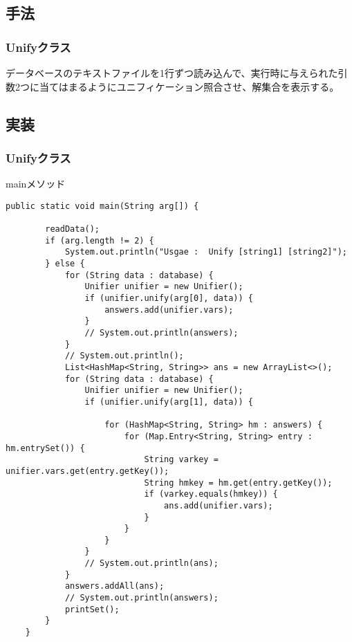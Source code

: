 \documentclass[a4j]{jarticle}
\begin{document}
\subsection{手法}
\subsubsection{Unifyクラス}
データベースのテキストファイルを1行ずつ読み込んで、実行時に与えられた引数2つに当てはまるようにユニフィケーション照合させ、解集合を表示する。

\subsection{実装}
\subsubsection{Unifyクラス}
mainメソッド
\begin{lstlisting}
public static void main(String arg[]) {

        readData();
        if (arg.length != 2) {
            System.out.println("Usgae :  Unify [string1] [string2]");
        } else {
            for (String data : database) {
                Unifier unifier = new Unifier();
                if (unifier.unify(arg[0], data)) {
                    answers.add(unifier.vars);
                }
                // System.out.println(answers);
            }
            // System.out.println();
            List<HashMap<String, String>> ans = new ArrayList<>();
            for (String data : database) {
                Unifier unifier = new Unifier();
                if (unifier.unify(arg[1], data)) {

                    for (HashMap<String, String> hm : answers) {
                        for (Map.Entry<String, String> entry : hm.entrySet()) {
                            String varkey = unifier.vars.get(entry.getKey());
                            String hmkey = hm.get(entry.getKey());
                            if (varkey.equals(hmkey)) {
                                ans.add(unifier.vars);
                            }
                        }
                    }
                }
                // System.out.println(ans);
            }
            answers.addAll(ans);
            // System.out.println(answers);
            printSet();
        }
    }\end{lstlisting}
\end{document}
